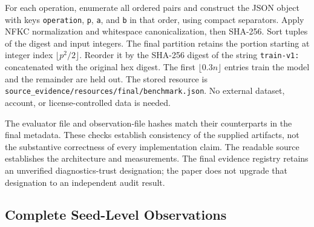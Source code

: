 \documentclass{article}
\begin{document}
For each operation, enumerate all ordered pairs and construct the JSON object with keys \texttt{operation}, \texttt{p}, \texttt{a}, and \texttt{b} in that order, using compact separators. Apply NFKC normalization and whitespace canonicalization, then SHA-256. Sort tuples of the digest and input integers. The final partition retains the portion starting at integer index $\lfloor p^2/2\rfloor$. Reorder it by the SHA-256 digest of the string \texttt{train-v1:} concatenated with the original hex digest. The first $\lfloor 0.3n\rfloor$ entries train the model and the remainder are held out. The stored resource is \texttt{source\_evidence/resources/final/benchmark.json}. No external dataset, account, or license-controlled data is needed.

The evaluator file and observation-file hashes match their counterparts in the final metadata. These checks establish consistency of the supplied artifacts, not the substantive correctness of every implementation claim. The readable source establishes the architecture and measurements. The final evidence registry retains an unverified diagnostics-trust designation; the paper does not upgrade that designation to an independent audit result.

\subsection{Complete Seed-Level Observations}
\end{document}
